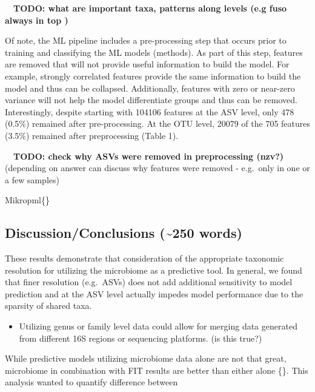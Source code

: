 \documentclass[
]{article}
\providecommand{\tightlist}{%
  \setlength{\itemsep}{0pt}\setlength{\parskip}{0pt}}
\begin{document}
~~\textbf{TODO: what are important taxa, patterns along levels (e.g fuso
always in top )}

Of note, the ML pipeline includes a pre-processing step that occurs
prior to training and classifying the ML models (methods). As part of
this step, features are removed that will not provide useful information
to build the model. For example, strongly correlated features provide
the same information to build the model and thus can be collapsed.
Additionally, features with zero or near-zero variance will not help the
model differentiate groups and thus can be removed. Interestingly,
despite starting with 104106 features at the ASV level, only 478 (0.5\%)
remained after pre-processing. At the OTU level, 20079 of the 705
features (3.5\%) remained after preprocessing (Table 1).

~~\textbf{TODO: check why ASVs were removed in preprocessing (nzv?)}\\
\hspace*{0.333em}\hspace*{0.333em}(depending on answer can discuss why
features were removed - e.g.~only in one or a few samples)

Mikropml\{\}

\hypertarget{discussionconclusions-250-words}{%
\subsection{Discussion/Conclusions (\textasciitilde250
words)}\label{discussionconclusions-250-words}}

These results demonstrate that consideration of the appropriate
taxonomic resolution for utilizing the microbiome as a predictive tool.
In general, we found that finer resolution (e.g.~ASVs) does not add
additional sensitivity to model prediction and at the ASV level actually
impedes model performance due to the sparsity of shared taxa.

\begin{itemize}
\tightlist
\item
  Utilizing genus or family level data could allow for merging data
  generated from different 16S regions or sequencing platforms. (is this
  true?)
\end{itemize}

While predictive models utilizing microbiome data alone are not that
great, microbiome in combination with FIT results are better than either
alone \{\}. This analysis wanted to quantify difference between
\end{document}
